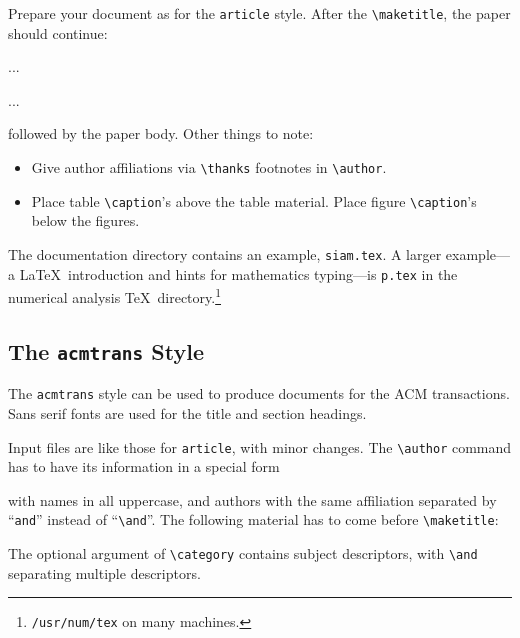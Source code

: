 Prepare your document as for the \verb|article| style.
After the \verb|\maketitle|, the paper should continue:
\begin{eg}
\begin{abstract}...\end{abstract}
\begin{keywords}...\end{keywords}
\begin{AMSMOS}...\end{AMSMOS}
\end{eg}
followed by the paper body.
Other things to note:
\begin{itemize}
\item  Give author affiliations via \verb|\thanks| footnotes in \verb|\author|.
\item  Place table \verb|\caption|'s above the table material.
Place figure \verb|\caption|'s below the figures.
\end{itemize}

The documentation directory contains an example, \verb|siam.tex|.
A larger example---a \LaTeX\ introduction and hints for
mathematics typing---is \verb|p.tex| in the numerical analysis
\TeX\ directory.\footnote{\verb|/usr/num/tex| on many machines.}

\subsection{The {\tt acmtrans} Style}

The {\tt acmtrans} style can be used to produce documents
for the ACM transactions.  Sans serif fonts are used for
the title and section headings.

Input files are like those for \verb|article|, with minor changes.
The \verb|\author| command has to have its information in
a special form
\begin{eg}
\author{JAMES E. ARCHER, JR.
       \\ Rational Machines
    \and RICHARD CONWAY and
         FRED B. SCHNEIDER\\
         Cornell University}
\end{eg}
with names in all uppercase, and authors with the same
affiliation separated by ``\verb|and|'' instead of ``\verb|\and|''.
The following material has to come before \verb|\maketitle|:
The optional argument of \verb|\category| contains subject descriptors,
with \verb|\and| separating multiple descriptors.

